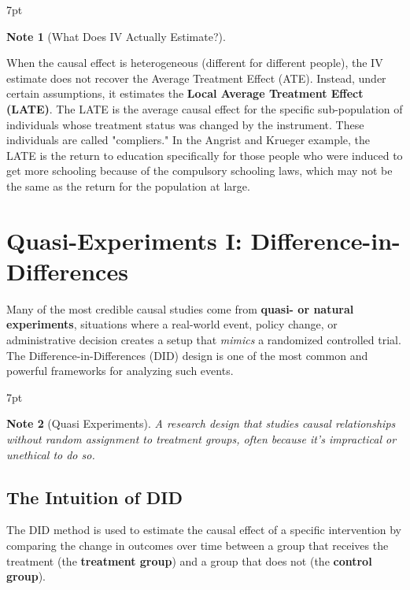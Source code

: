 \documentclass{article}
\newenvironment{blueblock}{
\def\FrameCommand{
  \hspace{1pt}
    {\color{DarkBlue}
    \vrule width 2pt}
    {\color{blueshade}
    \vrule width 4pt}
  \colorbox{blueshade}
}
\MakeFramed{
  \advance
  \hsize-
  \width
  \FrameRestore}
\noindent\hspace{-4.55pt}%
\begin{adjustwidth}{}{7pt}
\vspace{2pt}\vspace{2pt}
}
{\vspace{2pt}\end{adjustwidth}\endMakeFramed}
\newtheorem{note}{Note}
\begin{document}
\begin{blueblock}
\begin{note}[What Does IV Actually Estimate?]
\end{note}
When the causal effect is heterogeneous (different for different people), the IV estimate does not recover the Average Treatment Effect (ATE). Instead, under certain assumptions, it estimates the \textbf{Local Average Treatment Effect (LATE)}. The LATE is the average causal effect for the specific sub-population of individuals whose treatment status was changed by the instrument. These individuals are called "compliers." In the Angrist and Krueger example, the LATE is the return to education specifically for those people who were induced to get more schooling because of the compulsory schooling laws, which may not be the same as the return for the population at large.
\end{blueblock}





\section{Quasi-Experiments I: Difference-in-Differences}
\label{sec:did}

Many of the most credible causal studies come from \textbf{quasi- or natural experiments}, situations where a real-world event, policy change, or administrative decision creates a setup that \textit{mimics} a randomized controlled trial. The Difference-in-Differences (DID) design is one of the most common and powerful frameworks for analyzing such events.


\begin{blueblock}
\begin{note}[Quasi Experiments]
A research design that studies causal relationships without random assignment to treatment groups, often because it's impractical or unethical to do so.
\end{note}
\end{blueblock}

\subsection{The Intuition of DID}
\label{sub:did_intuition}

The DID method is used to estimate the causal effect of a specific intervention by comparing the change in outcomes over time between a group that receives the treatment (the \textbf{treatment group}) and a group that does not (the \textbf{control group}).
\end{document}

